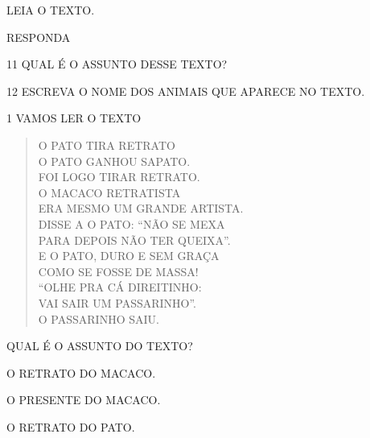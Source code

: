 \begin{escola}
\begin{multicols}
\end{multicols}

LEIA O TEXTO.



RESPONDA

\num{11} QUAL É O ASSUNTO DESSE TEXTO?


\num{12} ESCREVA O NOME DOS ANIMAIS QUE APARECE NO TEXTO.




\num{1} VAMOS LER O TEXTO

\begin{verse}
O PATO TIRA RETRATO\\
O PATO GANHOU SAPATO.\\
FOI LOGO TIRAR RETRATO.\\
O MACACO RETRATISTA\\
ERA MESMO UM GRANDE ARTISTA.\\
DISSE A O PATO: “NÃO SE MEXA\\
PARA DEPOIS NÃO TER QUEIXA”.\\
E O PATO, DURO E SEM GRAÇA\\
COMO SE FOSSE DE MASSA!\\
“OLHE PRA CÁ DIREITINHO:\\
VAI SAIR UM PASSARINHO”.\\
O PASSARINHO SAIU.
\end{verse}


QUAL É O ASSUNTO DO TEXTO?

\begin{escolha}
\item O RETRATO DO MACACO.

\item O PRESENTE DO MACACO.

\item O RETRATO DO PATO.


\end{escolha}
\end{escola}

